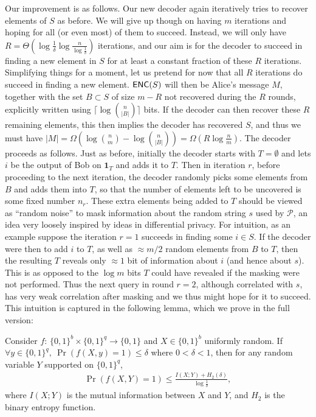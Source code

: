 Our improvement is as follows. Our new decoder again iteratively tries to recover elements of $S$ as before. We will give up though on having $m$ iterations and hoping for all (or even most) of them to succeed. Instead, we will only have $R = \Theta(\log \frac 1{\delta}\log \frac n{\log \frac 1{\delta}})$ iterations, and our aim is for the decoder to succeed in finding a new element in $S$ for at least a constant fraction of these $R$ iterations. Simplifying things for a moment, let us pretend for now that all $R$ iterations do succeed in finding a new element. $\textsf{ENC}(S)$ will then be Alice's message $M$, together with the set $B\subset S$ of size $m-R$ not recovered during the $R$ rounds, explicitly written using $\lceil\log{n \choose |B|}\rceil$ bits. If the decoder can then recover these $R$ remaining elements, this then implies the decoder has recovered $S$, and thus we must have $|M| = \Omega(\log{n\choose m} - \log{n \choose |B|}) = \Omega(R\log \frac nm)$. The decoder proceeds as follows. Just as before, initially the decoder starts with $T = \emptyset$ and lets $i$ be the output of Bob on $\mathbf{1}_T$ and adds it to $T$. Then in iteration $r$, before proceeding to the next iteration, the decoder randomly picks some elements from $B$ and adds them into $T$, so that the number of elements left to be uncovered is some fixed number $n_r$. These extra elements being added to $T$ should be viewed as ``random noise'' to mask information about the random string $s$ used by $\mathcal{P}$, an idea very loosely inspired by ideas in differential privacy. For intuition, as an example suppose the iteration $r=1$ succeeds in finding some $i\in S$. If the decoder were then to add $i$ to $T$, as well as $\approx m/2$ random elements from $B$ to $T$, then the resulting $T$ reveals only $\approx 1$ bit of information about $i$ (and hence about $s$). This is as opposed to the $\log m$ bits $T$ could have revealed if the masking were not performed. Thus the next query in round $r=2$, although correlated with $s$, has very weak correlation after masking and we thus might hope for it to succeed. This intuition is captured in the following lemma, which we prove in the full version:
\begin{lemma}\label{lem:information}
  Consider $f$: $\{0,1\}^b\times \{0,1\}^q\rightarrow \{0,1\}$ and $X\in\{0,1\}^b$ uniformly random. If $\forall y\in \{0,1\}^q,\ \Pr(f(X,y)=1)\le \delta$ where $0<\delta<1$, then for any random variable $Y$ supported on $\{0,1\}^q$,
  \begin{align}
    \Pr(f(X,Y)=1)\le \frac{I(X;Y)+H_2(\delta)}{\log \frac{1}{\delta}}, \label{eqn:adaptivity}
  \end{align}
  where $I(X;Y)$ is the mutual information between $X$ and $Y$, and $H_2$ is the binary entropy function.
\end{lemma}
